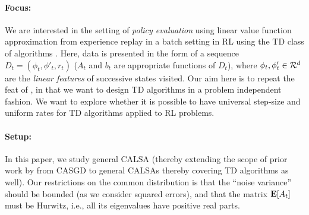 \paragraph{Focus:} We are interested in the setting of \emph{policy evaluation} \cite{dann} using linear value function approximation from experience replay \cite{lin} in a batch setting \cite{lange} in RL using the TD class of algorithms \cite{sutton,konda-tsitsiklis,gtd,gtd2,gtdmp}. Here, data is presented in the form of a sequence $D_t=(\phi_t,\phi'_t,r_t)$ ($A_t$ and $b_t$ are appropriate functions of $D_t$), where $\phi_t,\phi'_t\in \mathcal{R}^d$ are the \emph{linear features} of successive states visited. Our aim here is to repeat the feat of \cite{bach}, in that we want to design TD algorithms in a problem independent fashion. We want to explore whether it is possible to have universal step-size and uniform rates for TD algorithms applied to RL problems.
\paragraph{Setup:}  In this paper, we study general CALSA (thereby extending the scope of prior work by \citet{bach} from CASGD to general CALSAs thereby covering TD algorithms as well).  
Our restrictions on the common  distribution is that the ``noise variance'' should be bounded (as we consider squared errors), and that the matrix $\mathbf{E}[A_t]$ must be Hurwitz, i.e., all its eigenvalues have positive real parts. %
\begin{comment}
\begin{table*}
\begin{tabular}{|c|c|c|c|c}\hline
Problem& Universal Step-Size& Uniform Asymptotic Rate& Uniform Finite-Time Rate& Remark \\\hline
\end{tabular}
\end{table*}
\end{comment}
